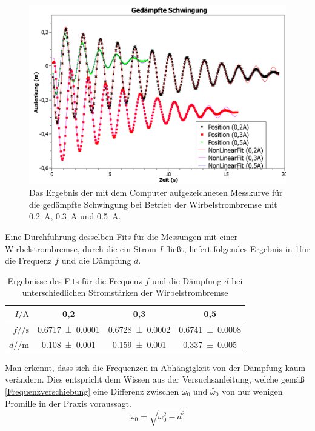 \documentclass[
	a4paper,
	12pt,
	pagesize,
	ngerman
]{scrartcl}
\begin{document}
	\begin{figure}[htb]
		\includegraphics[width=1\textwidth]{Gedaempfte_Schwingung_Graph}
		\centering
		\caption{Das Ergebnis der mit dem Computer aufgezeichneten Messkurve für die gedämpfte Schwingung bei Betrieb der Wirbelstrombremse mit \SI{0,2}{\ampere}, \SI{0,3}{\ampere} und \SI{0,5}{\ampere}.}
		\label{gedämpfte_Schwingung}
		\centering
	\end{figure}
	Eine Durchführung desselben Fits für die Messungen mit einer Wirbelstrombremse, durch die ein Strom $ I $ fließt, liefert folgendes Ergebnis in \cref{gedaempftTab}für die Frequenz $ f $ und die Dämpfung $ d $.\\
	\begin{table}[htb]
		\centering
		\begin{tabular}{ r | c | c | c |}
			$I /\si{\ampere}$& 0,2 & 0,3 & 0,5\\ \hline
			$f  /\si{\per \second}$ & \num{0,6717 \pm 0,0001} & \num{0,6728 \pm 0,0002} & \num{0,6741 \pm 0,0008}\\
			$d /\si{\per \meter}  $ & \num{0,108 \pm 0,001} & \num{0,159 \pm 0,001} & \num{0,337 \pm 0,005}
		\end{tabular}
		\caption{Ergebnisse des Fits für die Frequenz $ f $ und die Dämpfung $ d $ bei unterschiedlichen Stromstärken der Wirbelstrombremse}
		\label{gedaempftTab}
	\end{table}
	Man erkennt, dass sich die Frequenzen in Abhängigkeit von der Dämpfung kaum verändern. Dies entspricht dem Wissen aus der Versuchsanleitung, welche gemäß \cref{Frequenzverschiebung} eine Differenz zwischen $ \omega_0 $ und $ \tilde{\omega_0} $ von nur wenigen Promille in der Praxis voraussagt.
	\begin{equation}
		\tilde{\omega_0} = \sqrt{\omega_0^2 - d^2}
		\label{Frequenzverschiebung}
	\end{equation}
\end{document}
